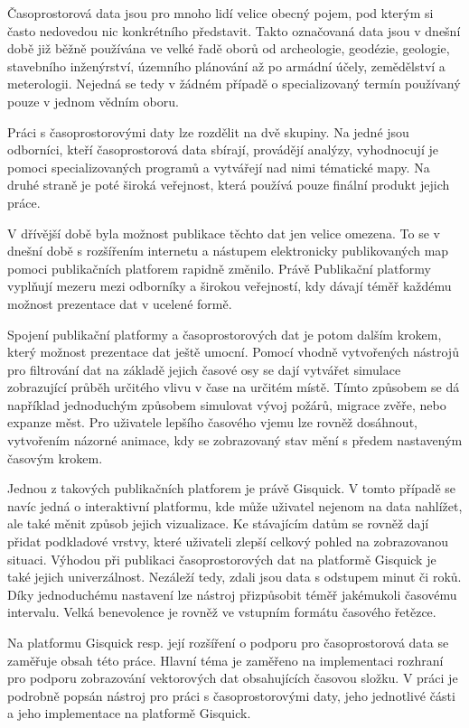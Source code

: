  Časoprostorová data jsou pro mnoho lidí velice obecný pojem, pod kterým si často nedovedou nic konkrétního představit. Takto označovaná data jsou v dnešní době již běžně používána ve velké řadě oborů od archeologie, geodézie, geologie, stavebního inženýrství, územního plánování až po armádní účely, zemědělství a meterologii. Nejedná se tedy v žádném případě o specializovaný termín používaný pouze v jednom vědním oboru. 

Práci s časoprostorovými daty lze rozdělit na dvě skupiny. Na jedné jsou odborníci, kteří časoprostorová data sbírají, provádějí analýzy, vyhodnocují je pomoci specializovaných programů a vytvářejí nad nimi tématické mapy. Na druhé straně je poté široká veřejnost, která používá pouze finální produkt jejich práce. 

V dřívější době byla možnost publikace těchto dat jen velice omezena. To se v dnešní době s rozšířením internetu a nástupem elektronicky publikovaných map pomoci publikačních platforem rapidně změnilo. Právě Publikační platformy vyplňují mezeru mezi odborníky a širokou veřejností, kdy dávají téměř každému možnost prezentace dat v ucelené formě. 


Spojení publikační platformy a časoprostorových dat je potom dalším krokem, který možnost prezentace dat ještě umocní. Pomocí vhodně vytvořených nástrojů pro filtrování dat na základě jejich časové osy se dají vytvářet simulace zobrazující průběh určitého vlivu v čase na určitém místě. Tímto způsobem se dá například jednoduchým způsobem simulovat vývoj požárů, migrace zvěře, nebo expanze měst. Pro uživatele lepšího časového vjemu lze rovněž dosáhnout, vytvořením názorné animace, kdy se zobrazovaný stav mění s předem nastaveným časovým krokem. 

Jednou z takových publikačních platforem je právě Gisquick. V tomto případě se navíc jedná o interaktivní platformu, kde může uživatel nejenom na data nahlížet, ale také měnit způsob jejich vizualizace. Ke stávajícím datům se rovněž dají přidat podkladové vrstvy, které uživateli zlepší celkový pohled na zobrazovanou situaci. Výhodou při publikaci časoprostorových dat na platformě Gisquick je také jejich univerzálnost. Nezáleží tedy, zdali jsou data s odstupem minut či roků. Díky jednoduchému nastavení lze nástroj přizpůsobit téměř jakémukoli časovému intervalu. Velká benevolence je rovněž ve vstupním formátu časového řetězce.  

\bigskip
Na platformu Gisquick resp. její rozšíření o podporu pro časoprostorová data se zaměřuje obsah této práce. Hlavní téma je zaměřeno na implementaci rozhraní pro podporu zobrazování vektorových dat obsahujících časovou složku. V práci je podrobně popsán nástroj pro práci s časoprostorovými daty, jeho jednotlivé části a jeho implementace na platformě Gisquick.

